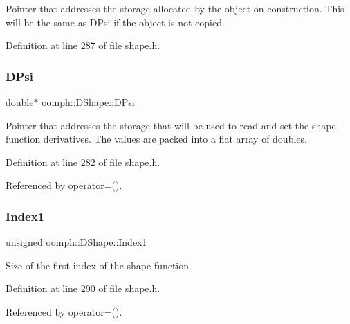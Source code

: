 Pointer that addresses the storage allocated by the object on construction. This will be the same as D\+Psi if the object is not copied. 



Definition at line 287 of file shape.\+h.

\mbox{\label{classoomph_1_1DShape_aedb450cd0b8aefc4ee216517c03e7f92}} 
\subsubsection{\texorpdfstring{D\+Psi}{DPsi}}
{\footnotesize\ttfamily double$\ast$ oomph\+::\+D\+Shape\+::\+D\+Psi\hspace{0.3cm}{\ttfamily [private]}}



Pointer that addresses the storage that will be used to read and set the shape-\/function derivatives. The values are packed into a flat array of doubles. 



Definition at line 282 of file shape.\+h.



Referenced by operator=().

\mbox{\label{classoomph_1_1DShape_a8fe23f1bb30846c65bc7ee4f79e387c8}} 
\subsubsection{\texorpdfstring{Index1}{Index1}}
{\footnotesize\ttfamily unsigned oomph\+::\+D\+Shape\+::\+Index1\hspace{0.3cm}{\ttfamily [private]}}



Size of the first index of the shape function. 



Definition at line 290 of file shape.\+h.



Referenced by operator=().

\mbox{\label{classoomph_1_1DShape_a4028a6e759b9f1905edf884aabaa2c6d}} 
